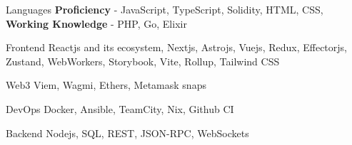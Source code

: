 

\begin{cvskills}

  \cvskill
    {Languages} %
    {\textbf{Proficiency} - JavaScript, TypeScript, Solidity, HTML, CSS, \textbf{Working Knowledge} - PHP, Go, Elixir} %

  \cvskill
    {Frontend} %
    {Reactjs and its ecosystem, Nextjs, Astrojs, Vuejs, Redux, Effectorjs, Zustand, WebWorkers, Storybook, Vite, Rollup, Tailwind CSS} %

  \cvskill
    {Web3} %
    {Viem, Wagmi, Ethers, Metamask snaps} %

  \cvskill
    {DevOps} %
    {Docker, Ansible, TeamCity, Nix, Github CI} %

  \cvskill
    {Backend} %
    {Nodejs, SQL, REST, JSON-RPC, WebSockets} %

\end{cvskills}
